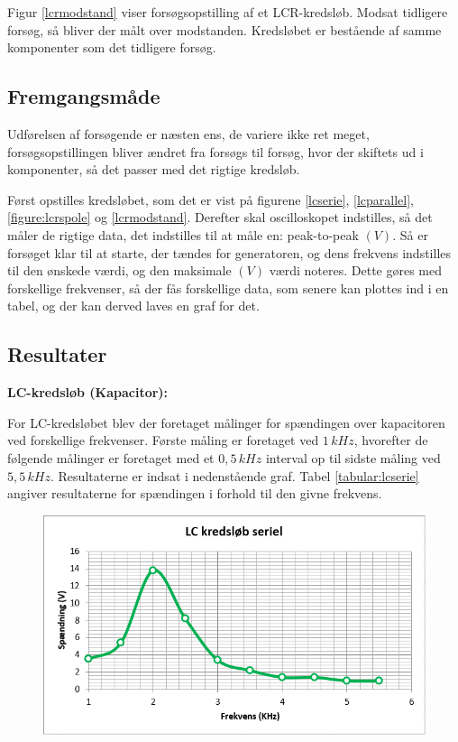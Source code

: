 Figur \ref{lcrmodstand} viser forsøgsopstilling af et LCR-kredsløb. Modsat tidligere forsøg, så bliver der målt over modstanden. Kredsløbet er bestående af samme komponenter som det tidligere forsøg.

\subsection{Fremgangsmåde}

Udførelsen af forsøgende er næsten ens, de variere ikke ret meget, forsøgsopstillingen bliver ændret fra forsøgs til forsøg, hvor der skiftets ud i komponenter, så det passer med det rigtige kredsløb.

Først opstilles kredsløbet, som det er vist på figurene \ref{lcserie}, \ref{lcparallel}, \ref{figure:lcrspole} og \ref{lcrmodstand}. Derefter skal oscilloskopet indstilles, så det måler de rigtige data, det indstilles til at måle en: peak-to-peak $(V)$. Så er forsøget klar til at starte, der tændes for generatoren, og dens frekvens indstilles til den ønskede værdi, og den maksimale $(V)$ værdi noteres. Dette gøres med forskellige frekvenser, så der fås forskellige data, som senere kan plottes ind i en tabel, og der kan derved laves en graf for det.

\subsection{Resultater}

\textbf{LC-kredsløb (Kapacitor):}

For LC-kredsløbet blev der foretaget målinger for spændingen over kapacitoren ved forskellige frekvenser. Første måling er foretaget ved $1 \, kHz$, hvorefter de følgende målinger er foretaget med et $0,5\, kHz$ interval op til sidste måling ved $5,5\, kHz$. Resultaterne er indsat i nedenstående graf. Tabel \ref{tabular:lcserie} angiver resultaterne for spændingen i forhold til den givne frekvens.

\begin{figure}[H]
\includegraphics[scale=1]{Setup/Graf3}
\caption{}
\label{graph:lcserie}
\end{figure}

